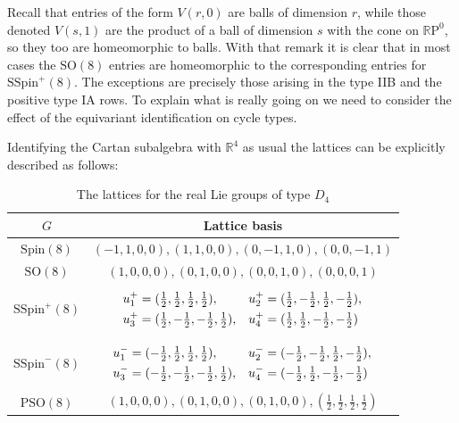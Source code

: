 \documentclass[11pt,a4paper]{article}
\renewcommand\arraystretch{1.15}
\def\SSpin{\mathrm{SSpin}}
\def\Spin{\mathrm{Spin}}
\def\SO{\mathrm{SO}}
\def\PSO{\mathrm{PSO}}
\def\SSpin{\mathrm{SSpin}}
\def\R{\mathbb{R}}
\def\RP{\R\mathrm{P}}
\begin{document}
Recall that entries of the form $V(r,0)$ are balls of dimension $r$, while those denoted $V(s,1)$ are the product of a ball of dimension $s$ with the cone on $\RP^0$, so they too are homeomorphic to balls. With that remark it is clear that in most cases the $\SO(8)$ entries are homeomorphic to the corresponding entries for $\SSpin^+(8)$. The exceptions are precisely those arising in the type IIB and the positive type IA rows. To explain what is really going on we need to consider the effect of the equivariant identification on cycle types.

Identifying the Cartan subalgebra with $\R^4$ as usual the lattices can be explicitly described as follows:

\bigskip

\begin{table}[h]

\centering
\renewcommand{\arraystretch}{1.35}
\setlength{\tabcolsep}{6pt}

\begin{tabular}{|c|c|}
\hline
$G$ & Lattice basis\\
\hline
$\Spin(8)$ & $(-1,1,0,0),(1,1,0,0),(0,-1,1,0),(0,0,-1,1)$
\\
\hline
$\SO(8)$ &$(1,0,0,0),(0,1,0,0),(0,0,1,0),(0,0,0,1)$
\\
\hline
$\SSpin^+(8)$ &
${\begin{aligned}
  &\textstyle u_1^+=(\frac12,\frac12,\frac12,\frac12),
&\textstyle u_2^+=(\frac12,-\frac12,\frac12,-\frac12),\\
&\textstyle u_3^+=(\frac12,-\frac12,-\frac12,\frac12),
&\textstyle u_4^+=(\frac12,\frac12,-\frac12,-\frac12)\phantom{,}
\end{aligned}}^{\strut}_{\strut}$
\\
\hline
$\SSpin^-(8)$ &
${\begin{aligned}
  &\textstyle u_1^-=(-\frac12,\frac12,\frac12,\frac12),
&\textstyle u_2^-=(-\frac12,-\frac12,\frac12,-\frac12),\\
&\textstyle u_3^-=(-\frac12,-\frac12,-\frac12,\frac12),
&\textstyle u_4^-=(-\frac12,\frac12,-\frac12,-\frac12)
\phantom{,}
\end{aligned}}^{\strut}_{\strut}$
\\
\hline
$\PSO(8)$&$(1,0,0,0),(0,1,0,0),(0,1,0,0),(\frac12,\frac12,\frac12,\frac12)$\\
\hline
\end{tabular}

\bigskip

\caption{The lattices for the  real Lie groups of type $D_4$}
\end{table}
\end{document}
